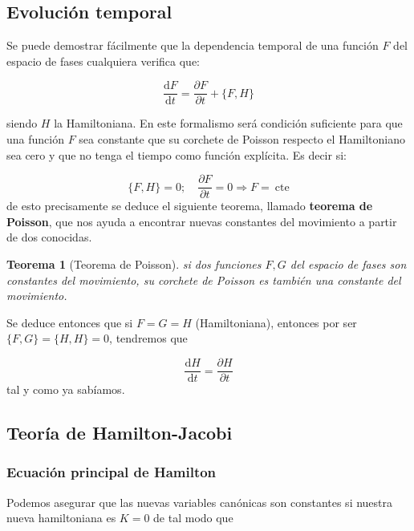 \documentclass[12pt,a4paper]{article}
\numberwithin{equation}{section}
\numberwithin{figure}{section}
\newcommand{\parciales}[2]{\frac{\partial #1}{\partial #2}}
\newcommand{\D}{\mathrm{d}}
\newcommand{\derivadas}[2]{\frac{\D #1}{\D #2}}
\newcommand{\cte}{\ \mathrm{cte}}
\newtheorem{theorem}{Teorema}[section]
\begin{document}
\subsection{Evolución temporal}

Se puede demostrar fácilmente que la dependencia temporal de una función $F$ del espacio de fases cualquiera verifica que:

\begin{equation}
\derivadas{F}{t} = \parciales{F}{t} + \{ F, H \}
\end{equation}

siendo $H$ la Hamiltoniana. En este formalismo será condición suficiente para que una función $F$ sea constante que su corchete de Poisson respecto el Hamiltoniano sea cero y que no tenga el tiempo como función explícita. Es decir si:

\begin{equation}
\{ F, H \} = 0; \quad \parciales{F}{t} = 0 \Longrightarrow F = \cte
\end{equation}
de esto precisamente se deduce el siguiente teorema, llamado \textbf{teorema de Poisson}, que nos ayuda a encontrar nuevas constantes del movimiento a partir de dos conocidas. 

\begin{theorem}[Teorema de Poisson]
si dos funciones $F,G$ del espacio de fases son constantes del movimiento, su corchete de Poisson es también una constante del movimiento.
\end{theorem}

Se deduce entonces que si $F=G=H$ (Hamiltoniana), entonces por ser $\{ F, G \} = \{ H, H \} = 0$, tendremos que 

\begin{equation}
\derivadas{H}{t} = \parciales{H}{t}
\end{equation}
tal y como ya sabíamos.


\subsection{Teoría de Hamilton-Jacobi}

\subsubsection{Ecuación principal de Hamilton}

Podemos asegurar que las nuevas variables canónicas son constantes si nuestra nueva hamiltoniana es $K=0$ de tal modo que
\end{document}
